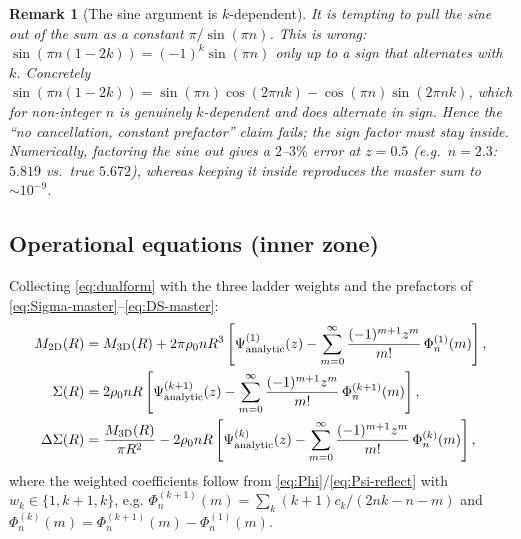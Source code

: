 \documentclass{article}
\newtheorem{remark}{Remark}
\begin{document}
\begin{remark}[The sine argument is $k$-dependent]\label{rem:sin}
It is tempting to pull the sine out of the sum as a constant
$\pi/\sin(\pi n)$.  This is wrong: $\sin(\pi n(1-2k))=(-1)^k\sin(\pi n)$ only up
to a sign that alternates with $k$.  Concretely
$\sin(\pi n(1-2k))=\sin(\pi n)\cos(2\pi nk)-\cos(\pi n)\sin(2\pi nk)$, which for
non-integer $n$ is genuinely $k$-dependent and \emph{does} alternate in sign.
Hence the ``no cancellation, constant prefactor'' claim fails; the sign factor
must stay inside.  Numerically, factoring the sine out gives a $2$--$3\%$ error
at $z=0.5$ (e.g.\ $n=2.3$: $5.819$ vs.\ true $5.672$), whereas keeping it inside
reproduces the master sum to $\sim10^{-9}$.
\end{remark}

\subsection{Operational equations (inner zone)}

Collecting \eqref{eq:dualform} with the three ladder weights and the
prefactors of \eqref{eq:Sigma-master}--\eqref{eq:DS-master}:
\begin{align}
M_{\rm 2D}(R)&=M_{\rm 3D}(R)+2\pi\rho_0 nR^3
  \left[\Psi^{(1)}_{\rm analytic}(z)
   -\sum_{m=0}^{\infty}\frac{(-1)^{m+1}z^m}{m!}\,\Phi^{(1)}_n(m)\right],\\
\Sigma(R)&=2\rho_0 nR
  \left[\Psi^{(k+1)}_{\rm analytic}(z)
   -\sum_{m=0}^{\infty}\frac{(-1)^{m+1}z^m}{m!}\,\Phi^{(k+1)}_n(m)\right],\\
\Delta\Sigma(R)&=\frac{M_{\rm 3D}(R)}{\pi R^2}
  -2\rho_0 nR
  \left[\Psi^{(k)}_{\rm analytic}(z)
   -\sum_{m=0}^{\infty}\frac{(-1)^{m+1}z^m}{m!}\,\Phi^{(k)}_n(m)\right],
\end{align}
where the weighted coefficients follow from \eqref{eq:Phi}/\eqref{eq:Psi-reflect}
with $w_k\in\{1,k+1,k\}$, e.g.
$\Phi^{(k+1)}_n(m)=\sum_k(k+1)c_k/(2nk-n-m)$ and
$\Phi^{(k)}_n(m)=\Phi^{(k+1)}_n(m)-\Phi^{(1)}_n(m)$.
\end{document}

